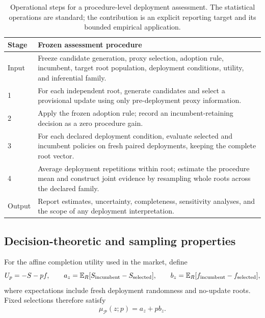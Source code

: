 \documentclass[10pt,letterpaper]{article}
\newcommand{\E}{\mathbb{E}}
\begin{document}
\begin{table}[t]\centering\small
\begin{tabular}{@{}p{.12\linewidth}p{.78\linewidth}@{}}\toprule
Stage & Frozen assessment procedure\\\midrule
Input & Freeze candidate generation, proxy selection, adoption rule, incumbent, target root population, deployment conditions, utility, and inferential family.\\
1 & For each independent root, generate candidates and select a provisional update using only pre-deployment proxy information.\\
2 & Apply the frozen adoption rule; record an incumbent-retaining decision as a zero procedure gain.\\
3 & For each declared deployment condition, evaluate selected and incumbent policies on fresh paired deployments, keeping the complete root vector.\\
4 & Average deployment repetitions within root; estimate the procedure mean and construct joint evidence by resampling whole roots across the declared family.\\
Output & Report estimates, uncertainty, completeness, sensitivity analyses, and the scope of any deployment interpretation.\\\bottomrule
\end{tabular}
\caption{Operational steps for a procedure-level deployment assessment. The statistical operations are standard; the contribution is an explicit reporting target and its bounded empirical application.}\label{tab:assessment-procedure}
\end{table}

\subsection{Decision-theoretic and sampling properties}
For the affine completion utility used in the market, define
\begin{equation}
U_p=-S-pf, \qquad
a_z=\E_R[S_{\rm incumbent}-S_{\rm selected}], \qquad
b_z=\E_R[f_{\rm incumbent}-f_{\rm selected}],
\label{eq:utility-components}
\end{equation}
where expectations include fresh deployment randomness and no-update roots. Fixed selections therefore satisfy
\begin{equation}
\mu_{\mathcal P}(z;p)=a_z+p b_z.
\label{eq:utility-frontier}
\end{equation}
\end{document}
